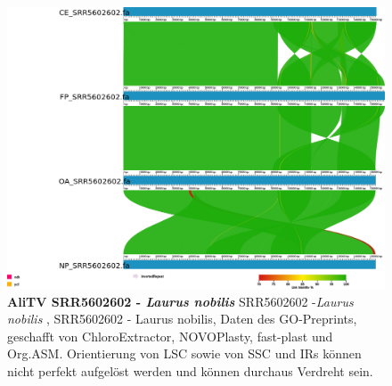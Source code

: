 \documentclass{scrartcl}
\begin{document}
\begin{figure}
\includegraphics[width=.9\linewidth]{./SRR5602602_1.png}
\caption[AliTV SRR5602602 - Laurus nobilis]{\textbf{AliTV SRR5602602 - \textit{Laurus nobilis}} SRR5602602 -\textit{Laurus nobilis} , SRR5602602 - Laurus nobilis, Daten des GO-Preprints, geschafft von ChloroExtractor, NOVOPlasty, fast-plast und Org.ASM. Orientierung von LSC sowie von SSC und IRs können nicht perfekt aufgelöst werden und können durchaus Verdreht sein.}
\end{figure}
\end{document}

